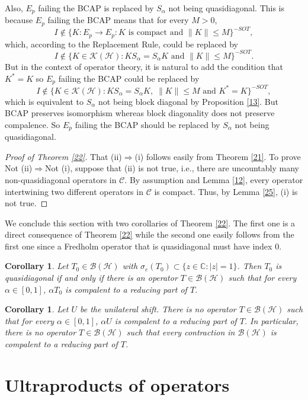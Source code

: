 \documentclass[11pt]{amsart}
\newtheorem{corollary}[theorem]{Corollary}
\theoremstyle{definition}
\numberwithin{equation}{section}
\begin{document}
Also, $E_{p}$ failing the BCAP is replaced by $S_{\alpha}$ not being quasidiagonal. This is because $E_{p}$ failing the BCAP means that for every $M>0$,
\[I\notin\{K:E_{p}\to E_{p}:K\text{ is compact and }\|K\|\leq M\}^{-SOT},\]
which, according to the Replacement Rule, could be replaced by
\[I\notin\{K\in\mathcal{K(H)}:KS_{\alpha}=S_{\alpha}K\text{ and }\|K\|\leq M\}^{-SOT}.\]
But in the context of operator theory, it is natural to add the condition that $K^{*}=K$ so $E_{p}$ failing the BCAP could be replaced by
\[I\notin\{K\in\mathcal{K(H)}:KS_{\alpha}=S_{\alpha}K,\;\|K\|\leq M\text{ and }K^{*}=K\}^{-SOT},\]
which is equivalent to $S_{\alpha}$ not being block diagonal by Proposition \ref{13}. But BCAP preserves isomorphism whereas block diagonality does not preserve
compalence. So $E_{p}$ failing the BCAP should be replaced by $S_{\alpha}$ not being quasidiagonal.
\begin{proof}[Proof of Theorem \ref{22}]
That (ii)$\Rightarrow$(i) follows easily from Theorem \ref{21}. To prove Not (ii)$\Rightarrow$Not (i), suppose that (ii) is not true, i.e., there are uncountably many
non-quasidiagonal operators in $\mathcal{C}$. By assumption and Lemma \ref{12}, every operator intertwining two different operators in $\mathcal{C}$ is compact. Thus, by
Lemma \ref{25}, (i) is not true.
\end{proof}
We conclude this section with two corollaries of Theorem \ref{22}. The first one is a direct consequence of Theorem \ref{22} while the second one easily follows from the
first one since a Fredholm operator that is quasidiagonal must have index 0.
\begin{corollary}\label{26}
Let $T_{0}\in \mathcal{B(H)}$ with $\sigma_{e}(T_{0})\subset\{z\in\mathbb{C}:|z|=1\}$. Then $T_{0}$ is quasidiagonal if and only if there is an operator $T\in \mathcal{B(
H)}$ such that for every $\alpha\in [0,1]$, $\alpha T_{0}$ is compalent to a reducing part of $T$.
\end{corollary}
\begin{corollary}\label{27}
Let $U$ be the unilateral shift. There is no operator $T\in \mathcal{B(H)}$ such that for every $\alpha\in [0,1]$, $\alpha U$ is compalent to a reducing part of $T$. In
particular, there is no operator $T\in \mathcal{B(H)}$ such that every contraction in $\mathcal{B(H)}$ is compalent to a reducing part of $T$.
\end{corollary}
\section{Ultraproducts of operators}\label{3}
\end{document}
